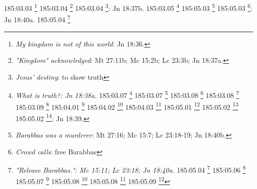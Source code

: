 {{{{{{{{{{{{{{{{{{{{{{{{{{{{{{{{{{{{{{{{{{{{{{{{{{{{{{{{{{{{{{{{{{{{{{{{{{{{{{{{{{{{{{{{{{{{{185:03.03 \footnote{\textit{My kingdom is not of this world}: Jn 18:36.}
185:03.04 \footnote{\textit{"Kingdom" acknowledged}: Mt 27:11b; Mc 15:2b; Lc 23:3b; Jn 18:37a.}
185:03.04 \footnote{\textit{Jesus' destiny}: to show truth}: Jn 18:37b.}
185:03.05 \footnote{\textit{What is truth?: Jn 18:38a.}
185:03.07 \footnote{\textit{Jews angry}: Lc 23:5.}
185:03.07 \footnote{\textit{Pilate}: I find no fault in him.: Lc 23:4; Jn 18:38b.}
185:03.08 \footnote{\textit{Galileans are under Herod}: Lc 23:6.}
185:03.08 \footnote{\textit{Honored Herod's jurisdiction}: Lc 23:12.}
185:03.09 \footnote{\textit{Pilate sends Jesus to Herod}: Lc 23:7.}
185:04.01 \footnote{\textit{Herod's feelings}: Lc 23:8.}
185:04.02 \footnote{\textit{Jesus silent before Herod}: Lc 23:9.}
185:04.03 \footnote{\textit{Jesus robed & returned to Pilate}: Lc 23:10-11.}
185:05.01 \footnote{\textit{I find no fault in him}: Lc 23:13-16.}
185:05.02 \footnote{\textit{Custom to free prisoner}: Mt 27:15; Mc 15:6; Lc 23:17; Jn 18:39a.}
185:05.02 \footnote{\textit{Pilate}: I will free Jesus}: Jn 18:39.}
185:05.03 \footnote{\textit{Barabbas was a murderer}: Mt 27:16; Mc 15:7; Lc 23:18-19; Jn 18:40b.}
185:05.03 \footnote{\textit{Crowd calls}: free Barabbas}: Jn 18:40a.}
185:05.04 \footnote{\textit{"Release Barabbas.": Mc 15:11; Lc 23:18; Jn 18:40a.}
185:05.04 \footnote{\textit{Which prisoner shall I release}: Mt 27:17; Mc 15:9; Jn 18:39b.}
185:05.06 \footnote{\textit{Jesus and Barabbas}: Mt 27:18; Mc 15:10.}
185:05.07 \footnote{\textit{Pilate's message from his wife}: Mt 27:19a.}
185:05.08 \footnote{\textit{Contents of message}: Mt 27:19b.}
185:05.08 \footnote{\textit{Delay helps enemies}: Mt 27:20; Mc 15:11.}
185:05.09 \footnote{\textit{What of Jesus? Crucify him!: Mt 27:22; Mc 15:12-13; Lc 23:20-21.}
185:05.10 \footnote{\textit{Why crucify Jesus?: Mt 27:23; Mc 15:14; Lc 23:22-23.}
185:06.02 \footnote{\textit{Jesus scourged}: Mt 27:26b; Mc 15:15b; Lc 23:16; Jn 19:1.}
185:06.02 \footnote{\textit{The scourging}: Mt 27:27-31a; Mc 15:16-20a; Jn 19:2-3.}
185:06.03 \footnote{\textit{Behold the man}: Jn 19:4-5,6b.}
185:06.05 \footnote{\textit{Crucify him!: Lc 23:23a; Jn 19:6a.}
185:06.07 \footnote{\textit{High priest faces Pilate}: Jn 19:7-9a.}
185:07.01 \footnote{\textit{Pilate questions Jesus}: Jn 19:9b.}
185:07.02 \footnote{\textit{Jesus does not reply}: Jn 19:9c.}
185:07.02 \footnote{\textit{Last dialog with Jesus}: Jn 19:10-11.}
185:07.05 \footnote{\textit{Pilate's last effort}: Jn 19:12-15.}
185:08.02 \footnote{\textit{"I find no guilt in him": Lc 23:4,22; Jn 18:38; Jn 19:4,6.}
185:08.02 \footnote{\textit{Pilate washes hands}: Mt 27:24-25.}
}}}}}}}}}}}}}}}}}}}}}}}}}}}}}}}}}}}}}}}}}}}}}}}}}}}}}}}}}}}}}}}}}}}}}}}}}}}}}}}}}}}}}}}}}}}}}}}}
